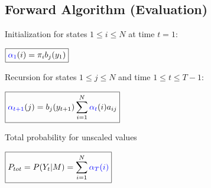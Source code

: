 \begin{minipage}[t]{0.49\textwidth}

\subsection{Forward Algorithm (Evaluation)}

\begin{aufzaehlung}
	\item Initialization for states $1\leq i \leq N$ at time $t=1$:\\
	
	\vspace{-0.3cm}
	
	$\boxed{\textcolor{blue}{\alpha_1}(i)=\pi_i b_j(y_1)}$
	
	\item Recursion for states $1\leq j \leq N$ and time $1\leq t\leq T-1$:\\
		
	\vspace{-0.3cm}
	
  $\boxed{\textcolor{blue}{\alpha_{t+1}}(j)=b_{j}(y_{t+1}) \sum\limits_{i=1}^{N}{\textcolor{blue}{\alpha_t}(i)a_{ij}}}$
	
	\item Total probability for unscaled values\\
		
	\vspace{-0.3cm}
	
	$\boxed{P_{tot} = P(Y_t|M)=\sum\limits_{i=1}^{N}{\textcolor{blue}{\alpha_T(i)}}}$
\end{aufzaehlung}
\end{minipage}
\hfill
